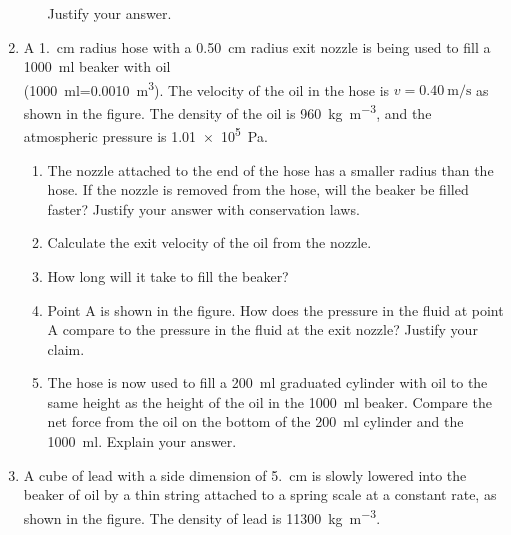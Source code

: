 \documentclass{../../../oss-classkick}
\begin{document}
\begin{enumerate}
\begin{enumerate}
    \vspace{.1in}Justify your answer.
  \end{enumerate}
  \newpage

  
\item A \SI{1.}{\centi\metre} radius hose with a \SI{.50}{\centi\metre} radius
  exit nozzle is being used to fill a \SI{1000}{\milli\litre} beaker with oil\\
  (\SI{1000}{\milli\litre}=\SI{.0010}{\metre\cubed}). The velocity of the oil
  in the hose is $v=\SI{0.40}{\metre\per\second}$ as shown in the figure. The
  density of the oil is \SI{960}{\kilo\gram\per\metre\cubed}, and the
  atmospheric pressure is \SI{1.01e5}\pascal.
  
  \begin{enumerate}
  \item The nozzle attached to the end of the hose has a smaller radius than
    the hose. If the nozzle is removed from the hose, will the beaker be filled
    faster? Justify your answer with conservation laws.
    \vspace{\stretch1}
    
  \item Calculate the exit velocity of the oil from the nozzle.
    \vspace{\stretch1}
    
  \item How long will it take to fill the beaker?
    \vspace{\stretch1}
    
  \item Point A is shown in the figure. How does the pressure in the fluid at
    point A compare to the pressure in the fluid at the exit nozzle? Justify
    your claim.
    \vspace{\stretch1}
    
  \item The hose is now used to fill a \SI{200}{\milli\litre} graduated
    cylinder with oil to the same height as the height of the oil in the
    \SI{1000}{\milli\litre} beaker. Compare the net force from the oil on the
    bottom of the \SI{200}{\milli\litre} cylinder and the
    \SI{1000}{\milli\litre}. Explain your answer.
    \vspace{\stretch1}
  \end{enumerate}
  \newpage
  
\item A cube of lead with a side dimension of \SI{5.}{\centi\metre} is slowly
  lowered into the beaker of oil by a thin string attached to a spring scale at
  a constant rate, as shown in the figure. The density of lead is
  \SI{11300}{\kilo\gram\per\metre\cubed}.
  

\end{enumerate}
\end{document}
